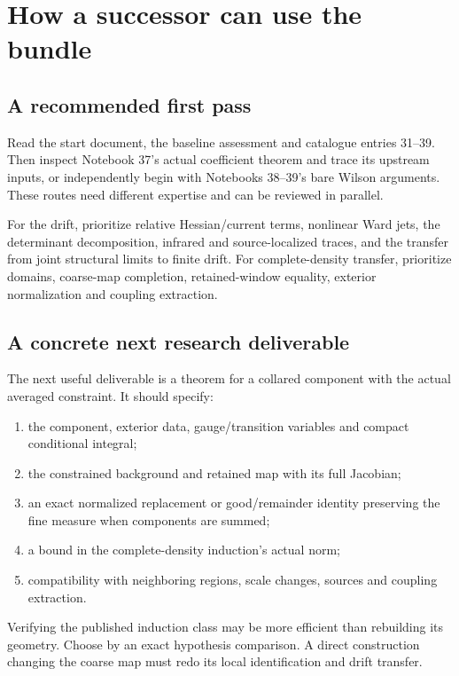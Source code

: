 \documentclass[11pt]{article}
\theoremstyle{remark}
\begin{document}
\section{How a successor can use the bundle}
\label{hdc-continuation}

\subsection{A recommended first pass}

Read the start document, the baseline assessment
and catalogue entries 31--39. Then inspect
Notebook 37's actual coefficient theorem and
trace its upstream inputs, or independently
begin with Notebooks 38--39's bare Wilson
arguments. These routes need different
expertise and can be reviewed in parallel.

For the drift, prioritize relative
Hessian/current terms, nonlinear Ward jets,
the determinant decomposition, infrared and
source-localized traces, and the transfer from
joint structural limits to finite drift.
For complete-density transfer, prioritize
domains, coarse-map completion, retained-window
equality, exterior normalization and coupling
extraction.

\subsection{A concrete next research deliverable}

The next useful deliverable is a theorem for a
collared component with the actual averaged
constraint. It should specify:
\begin{enumerate}
\item the component, exterior data,
gauge/transition variables and compact
conditional integral;
\item the constrained background and retained
map with its full Jacobian;
\item an exact normalized replacement or
good/remainder identity preserving the fine
measure when components are summed;
\item a bound in the complete-density
induction's actual norm;
\item compatibility with neighboring regions,
scale changes, sources and coupling extraction.
\end{enumerate}

Verifying the published induction class may
be more efficient than rebuilding its
geometry. Choose by an exact hypothesis
comparison. A direct construction changing
the coarse map must redo its local
identification and drift transfer.
\end{document}
